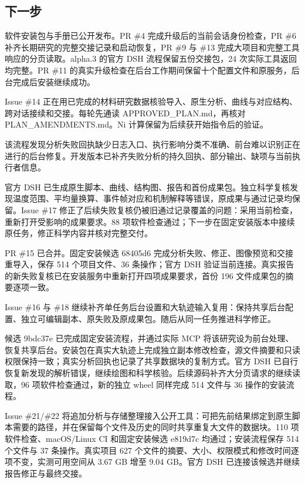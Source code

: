 \documentclass[11pt,a4paper]{ctexart}
\begin{document}
\subsection{下一步}


软件安装包与手册已公开发布。PR \#4 完成升级后的当前会话身份检查，PR \#6 补齐长期研究的完整交接记录和启动恢复，PR \#9 与 \#13 完成大项目和完整工具响应的分页读取。alpha.3 的官方 DSH 流程保留五份交接包，24 次实际工具返回均完整。PR \#11 的真实升级检查在后台工作期间保留十个配置文件和原服务，后台完成后安装继续成功。



Issue \#14 正在用已完成的材料研究数据核验导入、原生分析、曲线与对应结构、跨对话接续和交接。每轮先通读 APPROVED\_\allowbreak{}PLAN.md，再核对 PLAN\_\allowbreak{}AMENDMENTS.md。Ni 计算保留为后续获开始指令后的验证。



该流程发现分析失败回执缺少日志入口、执行影响分类不准确、前台难以识别正在进行的后台修复。开发版本已补齐失败分析的持久回执、部分输出、缺项与当前执行者信息。



官方 DSH 已生成原生脚本、曲线、结构图、报告和首份成果包。独立科学复核发现温度范围、平均量换算、事件帧对应和机制解释等错误，原成果与通过记录均保留。Issue \#17 修正了后续失败复核仍被旧通过记录覆盖的问题：采用当前检查，重新打开受影响的成果要求。88 项软件检查通过；下一步在固定安装版本中接续原任务，修正科学内容并核对完整交付。



PR \#15 已合并。固定安装候选 68405d6 完成分析失败、修正、图像预览和交接重导入，保存 514 个项目文件、36 条操作；官方 DSH 验证当前连接。真实报告的新失败复核已在安装服务中重新打开四项成果要求，首份 196 文件成果包的摘要逐项一致。



Issue \#16 与 \#18 继续补齐单任务后台设置和大轨迹输入复用：保持共享后台配置、独立可编辑副本、原失败及原成果包。随后从同一任务推进科学修正。



候选 9bdc37e 已完成固定安装流程，并通过实际 MCP 将该研究设为前台处理、恢复共享后台。安装包在真实大轨迹上完成独立副本修改检查，源文件摘要和只读权限保持一致；真实分析回执也记录了共享数据块的复制方式。官方 DSH 已自行恢复新发现的解析错误，继续绘图和科学核验。后续源码补齐大分页请求的继续读取，96 项软件检查通过，新的独立 wheel 同样完成 514 文件与 36 操作的安装流程。



Issue \#21/\allowbreak{}\#22 将追加分析与存储整理接入公开工具：可把先前结果绑定到原生脚本需要的路径，并在保留每个文件及历史的同时共享重复大文件的数据块。110 项软件检查、macOS/\allowbreak{}Linux CI 和固定安装候选 e819d7c 均通过；安装流程保存 514 个文件与 37 条操作。真实项目 627 个文件的摘要、大小、权限模式和修改时间逐项不变，实测可用空间从 3.67 GB 增至 9.04 GB。官方 DSH 已连接该候选并继续报告修正与最终交接。
\end{document}
